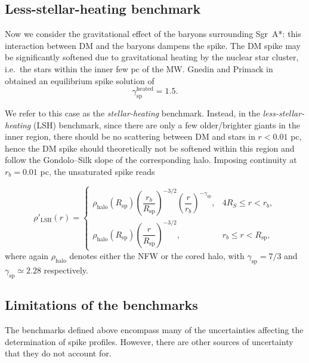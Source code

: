 \subsection{Less-stellar-heating benchmark} \label{less_stellar_heating}

Now we consider the gravitational effect of the baryons surrounding Sgr~A*: this interaction between DM and the baryons dampens the spike.
The DM spike may be significantly softened due to gravitational heating by the nuclear star cluster, i.e.\ the stars within the inner few pc of
the MW. Gnedin and Primack in \cite{GnedinPrimack2004} obtained an equilibrium spike solution of
\begin{equation}
\gamma_{\mathrm{sp}}^{\mathrm{heated}} = 1.5.
\end{equation}

We refer to this case as the \emph{stellar-heating} benchmark. Instead, in the \emph{less-stellar-heating} (LSH) benchmark, since there are only a few older/brighter giants in the inner region,
there should be no scattering between DM and stars in $r < 0.01$ pc, hence the DM spike
should theoretically not be softened within this region and follow the Gondolo--Silk slope of the corresponding halo.
Imposing continuity at $r_b = 0.01$ pc, the unsaturated
spike reads

\begin{equation}
\rho'_{\mathrm{LSH}}(r)
=
\begin{cases}
\rho_{\mathrm{halo}}(R_{\mathrm{sp}})
\left(\dfrac{r_b}{R_{\mathrm{sp}}}\right)^{-3/2}
\left(\dfrac{r}{r_b}\right)^{-\gamma_{\mathrm{sp}}},
& 4R_S \leq r < r_b,
\\[10pt]
\rho_{\mathrm{halo}}(R_{\mathrm{sp}})
\left(\dfrac{r}{R_{\mathrm{sp}}}\right)^{-3/2},
& r_b \leq r < R_{\mathrm{sp}},
\end{cases}
\label{eq:lh}
\end{equation}
where again $\rho_{\mathrm{halo}}$ denotes either the NFW or the cored halo,
with $\gamma_{\mathrm{sp}} = 7/3$ and $\gamma_{\mathrm{sp}} \simeq 2.28$
respectively.




\subsection{Limitations of the benchmarks} \label{sec:benchlimitations}

The benchmarks defined above encompass many of the
uncertainties affecting the determination of spike profiles.
However, there are other
sources of uncertainty that they do not account for.

